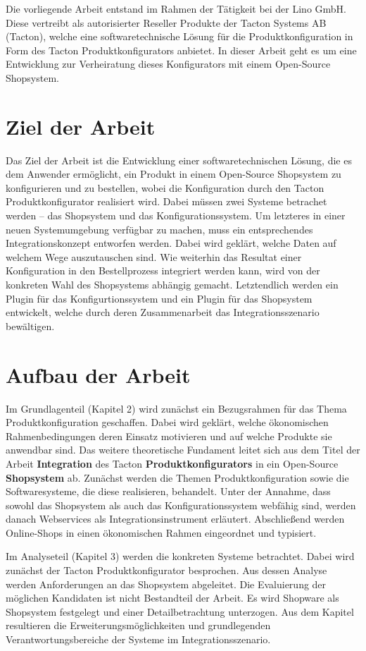 \documentclass[11pt, a4paper, titlepage, listof=totoc, bibliography=totoc, index=totoc, twoside, openright, headings=normal]{scrreprt}
\begin{document}
Die vorliegende Arbeit entstand im Rahmen der Tätigkeit bei der Lino GmbH. Diese vertreibt als autorisierter Reseller Produkte der Tacton Systems AB (Tacton), welche eine softwaretechnische Lösung für die Produktkonfiguration in Form des Tacton Produktkonfigurators anbietet. In dieser Arbeit geht es um eine Entwicklung zur Verheiratung dieses Konfigurators mit einem Open-Source Shopsystem.

\section{Ziel der Arbeit}
Das Ziel der Arbeit ist die Entwicklung einer softwaretechnischen Lösung, die es dem Anwender ermöglicht, ein Produkt in einem Open-Source Shopsystem zu konfigurieren und zu bestellen, wobei die Konfiguration durch den Tacton Produktkonfigurator realisiert wird. Dabei müssen zwei Systeme betrachet werden -- das Shopsystem und das Konfigurationssystem. Um letzteres in einer neuen Systemumgebung verfügbar zu machen, muss ein entsprechendes Integrationskonzept entworfen werden. Dabei wird geklärt, welche Daten auf welchem Wege auszutauschen sind. Wie weiterhin das Resultat einer Konfiguration in den Bestellprozess integriert werden kann, wird von der konkreten Wahl des Shopsystems abhängig gemacht. Letztendlich werden ein Plugin für das Konfigurtionssystem und ein Plugin für das Shopsystem entwickelt, welche durch deren Zusammenarbeit das Integrationsszenario bewältigen.

\section{Aufbau der Arbeit}
Im Grundlagenteil (Kapitel 2) wird zunächst ein Bezugsrahmen für das Thema Produktkonfiguration geschaffen. Dabei wird geklärt, welche ökonomischen Rahmenbedingungen deren Einsatz motivieren und auf welche Produkte sie anwendbar sind. Das weitere theoretische Fundament leitet sich aus dem Titel der Arbeit \glqq \textbf{Integration} des Tacton \textbf{Produktkonfigurators} in ein Open-Source \textbf{Shopsystem}\grqq{} ab. Zunächst werden die Themen Produktkonfiguration sowie die Softwaresysteme, die diese realisieren, behandelt. Unter der Annahme, dass sowohl das Shopsystem als auch das Konfigurationssystem webfähig sind, werden danach Webservices als Integrationsinstrument erläutert. Abschließend werden Online-Shops in einen ökonomischen Rahmen eingeordnet und typisiert. 

Im Analyseteil (Kapitel 3) werden die konkreten Systeme betrachtet. Dabei wird zunächst der Tacton Produktkonfigurator besprochen. Aus dessen Analyse werden Anforderungen an das Shopsystem abgeleitet. Die Evaluierung der möglichen Kandidaten ist nicht Bestandteil der Arbeit. Es wird Shopware als Shopsystem festgelegt und einer Detailbetrachtung unterzogen. Aus dem Kapitel resultieren die Erweiterungsmöglichkeiten und grundlegenden Verantwortungsbereiche der Systeme im Integrationsszenario.
\end{document}
